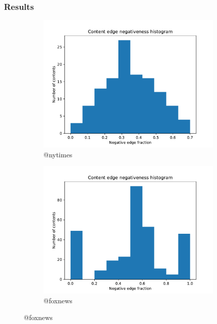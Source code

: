 \documentclass{beamer}
\begin{document}
\begin{frame}[c]
	\frametitle{Results}

        \begin{figure}
        \begin{center}
            \begin{subfigure}[b]{0.4\textwidth}
                \centering
                \includegraphics[width=\textwidth]{out/nytimes2000/neg-fraction-content-hist.pdf}
                \caption{@nytimes}
                \label{fig:nytimes-nef}
            \end{subfigure}
            \begin{subfigure}[b]{0.4\textwidth}
                \centering
                \includegraphics[width=\textwidth]{out/foxnews2000/neg-fraction-content-hist.pdf}
                \caption{@foxnews}
                \label{fig:out/foxnews2000/neg-fraction-content-hist.pdf}
            \end{subfigure}
        \end{center}
        \end{figure}
        

\end{frame}
\end{document}
